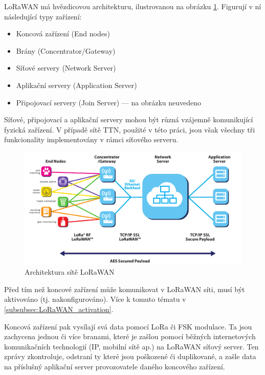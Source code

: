     \label{subsubsec:LoRaWAN_architecture}

    LoRaWAN má hvězdicovou architekturu, ilustrovanou na obrázku 
    \ref{fig:LoRaWAN_architecture}. Figurují v ní následující typy zařízení:

    \begin{itemize}
        \item Koncová zařízení (End nodes)
        \item Brány (Concentrator/Gateway)
        \item Síťové servery (Network Server)
        \item Aplikační servery (Application Server)
        \item Připojovací servery (Join Server) --- na obrázku neuvedeno
    \end{itemize}

    Síťové, připojovací a aplikační servery mohou být různá vzájemně 
    komunikující fyzická zařízení. 
    V případě sítě TTN, použité v této práci, jsou však všechny tři 
    funkcionality implementovány v rámci síťového serveru.

    \begin{figure}[h]
        \begin{centering}
            \includegraphics[width=1\textwidth]{Figures/lorawan}
            \caption{Architektura sítě LoRaWAN}
            \label{fig:LoRaWAN_architecture}
        \end{centering}
    \end{figure}

    Před tím než koncové zařízení může komunikovat v LoRaWAN síti, musí být
    aktivováno (tj. nakonfigurováno). 
    Více k tomuto tématu v \ref{subsubsec:LoRaWAN_activation}.

    Koncová zařízení pak vysílají svá data pomocí LoRa či FSK modulace. 
    Ta jsou zachycena jednou či více branami, které je zašlou pomocí běžných 
    internetových komunikačních technologií (IP, mobilní sítě ap.) na LoRaWAN 
    síťový server. Ten zprávy zkontroluje, odstraní ty které jsou poškozené či 
    duplikované, a zašle data na příslušný aplikační server provozovatele daného 
    koncového zařízení. 

